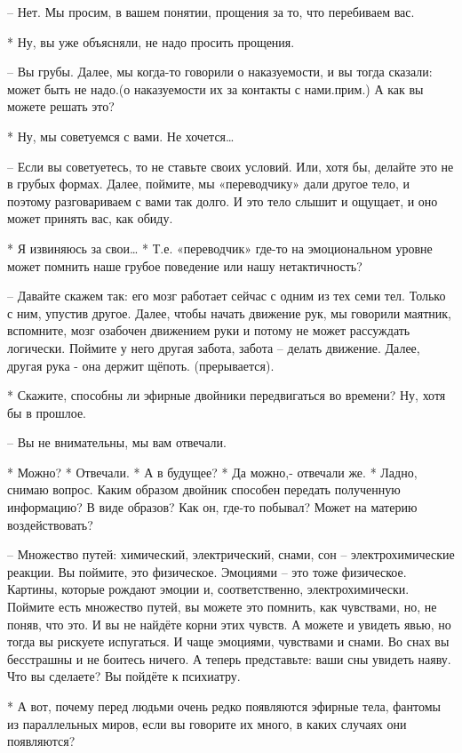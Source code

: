  – Нет. Мы просим, в вашем понятии, прощения за то, что перебиваем вас.

 * Ну, вы уже объясняли, не надо просить прощения.

 – Вы грубы. Далее, мы когда-то говорили о наказуемости, и вы тогда сказали: может быть не надо.(о наказуемости их за контакты с нами.прим.) А как вы можете решать это?

 * Ну, мы советуемся с вами. Не хочется…

 – Если вы советуетесь, то не ставьте своих условий. Или, хотя бы, делайте это не в грубых формах. Далее, поймите, мы «переводчику» дали другое тело, и поэтому разговариваем с вами так долго. И это тело слышит и ощущает, и оно может принять вас, как обиду.

 * Я извиняюсь за свои…
 * Т.е. «переводчик» где-то на эмоциональном уровне может помнить наше грубое поведение или нашу нетактичность?

 – Давайте скажем так: его мозг работает сейчас с одним из тех семи тел. Только с ним, упустив другое. Далее, чтобы начать движение рук, мы говорили маятник, вспомните, мозг озабочен движением руки и потому не может рассуждать логически. Поймите у него другая забота, забота – делать движение. Далее, другая рука -  она держит щёпоть. (прерывается).

 * Скажите, способны ли эфирные двойники передвигаться во времени? Ну, хотя бы в прошлое.

 – Вы не внимательны, мы вам отвечали.

 * Можно? 
 * Отвечали. 
 * А в будущее? 
 * Да можно,- отвечали же.
 * Ладно, снимаю вопрос. Каким образом двойник способен передать полученную информацию? В виде образов? Как он, где-то побывал? Может на материю воздействовать?

 – Множество путей: химический, электрический, снами, сон – электрохимические
 реакции. Вы поймите, это физическое. Эмоциями – это тоже физическое. Картины, которые рождают эмоции и, соответственно, электрохимически. Поймите есть множество путей, вы можете это помнить, как чувствами, но, не поняв, что это. И вы не найдёте корни этих чувств. А можете и увидеть явью, но тогда вы рискуете испугаться. И чаще эмоциями, чувствами и снами. Во снах вы бесстрашны и не боитесь ничего. А теперь представьте: ваши сны увидеть наяву. Что вы сделаете? Вы пойдёте к психиатру.

 * А вот, почему перед людьми очень редко появляются эфирные тела, фантомы из параллельных миров, если вы говорите их много, в каких случаях они появляются?

